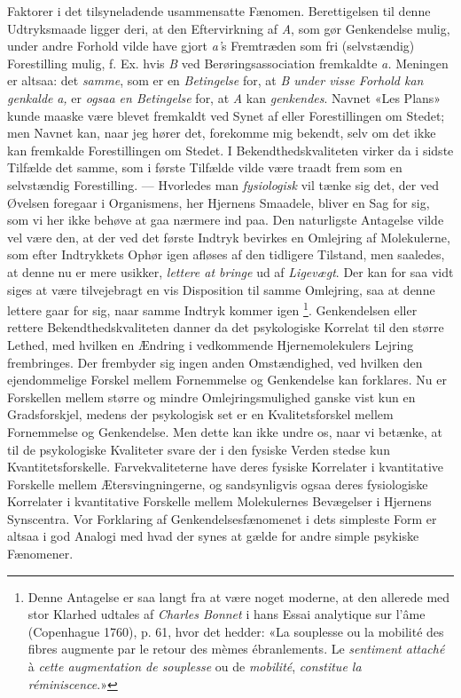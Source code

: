 \documentclass[12pt,a4paper,openany]{book}
\newcommand{\opage}[1]{\marginnote{\footnotesize\textit{[#1]}}}
\begin{document}
Faktorer i det tilsyneladende usammensatte Fænomen. Berettigelsen til denne
Udtryksmaade ligger deri, at den Eftervirkning af \textit{A}, som gør
Genkendelse mulig, under andre Forhold vilde have gjort \textit{a'}s Fremtræden
som fri (selvstændig) Forestilling mulig, f. Ex. hvis \textit{B} ved
Berøringsassociation fremkaldte \textit{a.} Meningen er altsaa: det
\emph{samme}, som er en \emph{Betingelse} for, at \textit{B under visse Forhold
kan genkalde} \textit{a,} er \emph{ogsaa en Betingelse} for, at \textit{A} kan
\emph{genkendes}. Navnet «Les Plans» kunde maaske være blevet fremkaldt ved
Synet af eller Forestillingen om Stedet; men Navnet kan, naar jeg hører det,
forekomme mig bekendt, selv om det ikke kan fremkalde Forestillingen om Stedet.
I Bekendthedskvaliteten virker da i sidste Tilfælde det samme, som i første
Tilfælde vilde være traadt frem som en selvstændig Forestilling. --- Hvorledes
man \emph{fysiologisk} vil tænke sig det, der ved Øvelsen foregaar i
Organismens, her Hjernens Smaadele, bliver en Sag for sig, som vi her ikke
behøve at gaa nærmere ind paa. Den naturligste Antagelse vilde vel være den, at
der ved det første Indtryk bevirkes en Omlejring af Molekulerne, som efter
Indtrykkets Ophør igen afløses af den tidligere Tilstand, men saaledes, at denne
\setcounter{footnote}{0}%
\opage{13}nu er mere usikker, \emph{lettere at bringe} ud af \emph{Ligevægt}.
Der kan for saa vidt siges at være tilvejebragt en vis Disposition til samme
Omlejring, saa at denne lettere gaar for sig, naar samme Indtryk kommer igen%
\footnote[1]{Denne Antagelse er saa langt fra at være noget moderne, at den
allerede med stor Klarhed udtales af \emph{Charles Bonnet} i hans Essai
analytique sur l'âme (Copenhague 1760), p. 61, hvor det hedder: «La souplesse
ou la mobilité des fibres augmente par le retour des mèmes ébranlements. Le
\emph{sentiment attaché} à \emph{cette augmentation de souplesse} ou de
\emph{mobilité}, \emph{constitue la réminiscence}.»}. Genkendelsen eller
rettere Bekendthedskvaliteten danner da det psykologiske Korrelat til den
større Lethed, med hvilken en Ændring i vedkommende Hjernemolekulers Lejring
frembringes. Der frembyder sig ingen anden Omstændighed, ved hvilken den
ejendommelige Forskel mellem Fornemmelse og Genkendelse kan forklares. Nu er
Forskellen mellem større og mindre Omlejringsmulighed ganske vist kun en
Gradsforskjel, medens der psykologisk set er en Kvalitetsforskel mellem
Fornemmelse og Genkendelse. Men dette kan ikke undre os, naar vi betænke, at
til de psykologiske Kvaliteter svare der i den fysiske Verden stedse kun
Kvantitetsforskelle. Farvekvaliteterne have deres fysiske Korrelater i
kvantitative Forskelle mellem Ætersvingningerne, og sandsynligvis ogsaa deres
fysiologiske Korrelater i kvantitative Forskelle mellem Molekulernes Bevægelser
i Hjernens Synscentra. Vor Forklaring af Genkendelsesfænomenet i dets simpleste
Form er altsaa i god Analogi med hvad der synes at gælde for andre simple
psykiske Fænomener.
\end{document}
